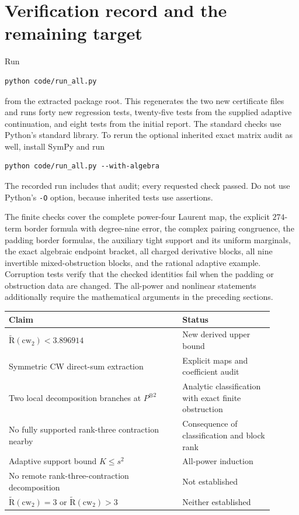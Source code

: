 \documentclass[11pt]{article}
\theoremstyle{definition}\newtheorem{definition}[theorem]{Definition}
\newcommand{\AR}{\widetilde{\mathrm R}}
\newcommand{\cw}{\mathrm{cw}}
\begin{document}
\section{Verification record and the remaining target}\label{sec:status}
Run
\begin{verbatim}
python code/run_all.py
\end{verbatim}
from the extracted package root. This regenerates the two new certificate files and runs forty new regression tests, twenty-five tests from the supplied adaptive continuation, and eight tests from the initial report. The standard checks use Python's standard library. To rerun the optional inherited exact matrix audit as well, install SymPy and run
\begin{verbatim}
python code/run_all.py --with-algebra
\end{verbatim}
The recorded run includes that audit; every requested check passed. Do not use Python's \texttt{-O} option, because inherited tests use assertions.

The finite checks cover the complete power-four Laurent map, the explicit $274$-term border formula with degree-nine error, the complex pairing congruence, the padding border formulas, the auxiliary tight support and its uniform marginals, the exact algebraic endpoint bracket, all charged derivative blocks, all nine invertible mixed-obstruction blocks, and the rational adaptive example. Corruption tests verify that the checked identities fail when the padding or obstruction data are changed. The all-power and nonlinear statements additionally require the mathematical arguments in the preceding sections.

\begin{center}
\begin{tabular}{p{0.59\linewidth}p{0.31\linewidth}}
\toprule
Claim&Status\\\midrule
$\AR(\cw_2)<3.896914$&New derived upper bound\\
Symmetric CW direct-sum extraction&Explicit maps and coefficient audit\\
Two local decomposition branches at $P^{\otimes2}$&Analytic classification with exact finite obstruction\\
No fully supported rank-three contraction nearby&Consequence of classification and block rank\\
Adaptive support bound $K\le s^2$&All-power induction\\
No remote rank-three-contraction decomposition&Not established\\
$\AR(\cw_2)=3$ or $\AR(\cw_2)>3$&Neither established\\\bottomrule
\end{tabular}
\end{center}
\end{document}
